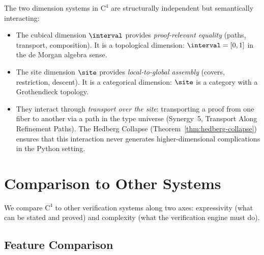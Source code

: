 \begin{remark}
\label{rem:two-dimensions}
The two dimension systems in $\mathrm{C}^4$ are structurally independent
but semantically interacting:
\begin{itemize}
\item The cubical dimension $\interval$ provides \emph{proof-relevant
  equality} (paths, transport, composition).  It is a topological
  dimension: $\interval = [0,1]$ in the de Morgan algebra sense.
\item The site dimension $\site$ provides \emph{local-to-global assembly}
  (covers, restriction, descent).  It is a categorical dimension:
  $\site$ is a category with a Grothendieck topology.
\item They interact through \emph{transport over the site}: transporting
  a proof from one fiber to another via a path in the type universe
  (Synergy~5, Transport Along Refinement Paths).  The Hedberg Collapse
  (Theorem~\ref{thm:hedberg-collapse}) ensures that this interaction
  never generates higher-dimensional complications in the Python setting.
\end{itemize}
\end{remark}


\section{Comparison to Other Systems}
\label{sec:comparison}

We compare $\mathrm{C}^4$ to other verification systems along two axes:
expressivity (what can be stated and proved) and complexity (what the
verification engine must do).

\subsection{Feature Comparison}

